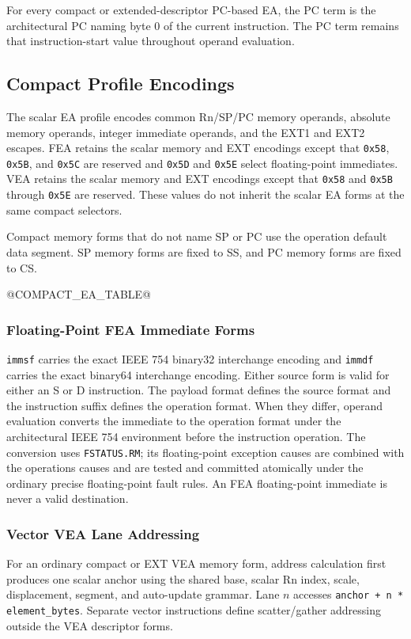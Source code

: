 For every compact or extended-descriptor PC-based EA, the PC term is the architectural PC naming byte 0 of the current instruction.
The PC term remains that instruction-start value throughout operand evaluation.

\clearpage
\subsection{Compact Profile Encodings}
The scalar EA profile encodes common Rn/SP/PC memory operands, absolute memory operands, integer immediate operands,
and the EXT1 and EXT2 escapes. FEA retains the scalar memory and EXT encodings except that \texttt{0x58},
\texttt{0x5B}, and \texttt{0x5C} are reserved and \texttt{0x5D} and \texttt{0x5E} select floating-point
immediates. VEA retains the scalar memory and EXT encodings except that \texttt{0x58} and
\texttt{0x5B} through \texttt{0x5E} are reserved. These values do not inherit the scalar EA forms at
the same compact selectors.

Compact memory forms that do not name SP or PC use the operation default data segment. SP memory forms are fixed to
SS, and PC memory forms are fixed to CS.



\clearpage
@COMPACT_EA_TABLE@
\label{table:compact-ea-encoding}

\subsubsection{Floating-Point FEA Immediate Forms}
\texttt{immsf} carries the exact IEEE 754 binary32 interchange encoding and \texttt{immdf} carries the exact
binary64 interchange encoding. Either source form is valid for either an S or D instruction. The payload format
defines the source format and the instruction suffix defines the operation format. When they differ, operand
evaluation converts the immediate to the operation format under the architectural IEEE 754 environment before the
instruction operation. The conversion uses \texttt{FSTATUS.RM}; its floating-point exception causes are combined
with the operation\textquotesingle{}s causes and are tested and committed atomically under the ordinary precise floating-point fault
rules. An FEA floating-point immediate is never a valid destination.

\subsubsection{Vector VEA Lane Addressing}
For an ordinary compact or EXT VEA memory form, address calculation first produces one scalar anchor using the
shared base, scalar Rn index, scale, displacement, segment, and auto-update grammar. Lane $n$ accesses
\texttt{anchor + n * element\_bytes}. Separate vector instructions define scatter/gather addressing outside the
VEA descriptor forms.

